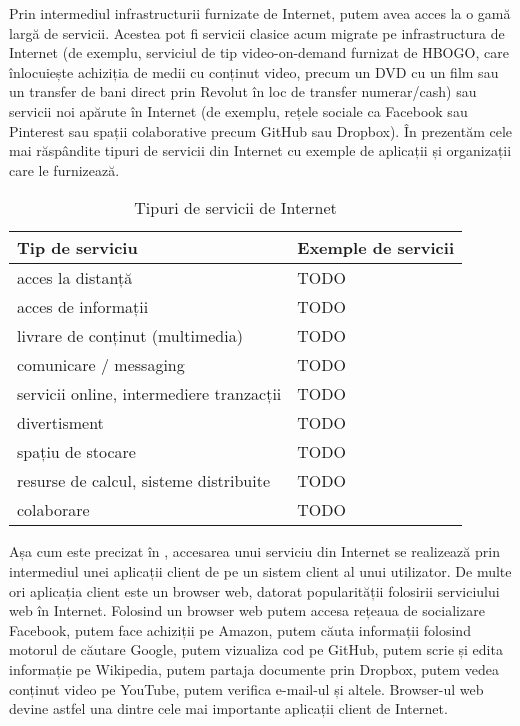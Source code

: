 Prin intermediul infrastructurii furnizate de Internet, putem avea acces la o gamă largă de servicii. Acestea pot fi servicii clasice acum migrate pe infrastructura de Internet (de exemplu, serviciul de tip video-on-demand furnizat de HBOGO, care înlocuiește  achiziția de medii cu conținut video, precum un DVD cu un film sau un transfer de bani direct prin Revolut în loc de transfer numerar/cash) sau servicii noi apărute în Internet (de exemplu, rețele sociale ca Facebook sau Pinterest sau spații colaborative precum GitHub sau Dropbox). În  prezentăm cele mai răspândite tipuri de servicii din Internet cu exemple de aplicații și organizații care le furnizează.

\begin{table}[!htb]
  \caption{Tipuri de servicii de Internet}
  \begin{center}
    \begin{tabular}{ p{} p{} }
      \toprule
        \textbf{Tip de serviciu} &
        \textbf{Exemple de servicii} \\
      \midrule
        acces la distanță &
        TODO \\

        acces de informații &
        TODO \\

        livrare de conținut (multimedia) &
        TODO \\

        comunicare / messaging &
        TODO \\

        servicii online, intermediere tranzacții &
        TODO \\

        divertisment &
        TODO \\

        spațiu de stocare &
        TODO \\

        resurse de calcul, sisteme distribuite &
        TODO \\

        colaborare &
        TODO \\
      \bottomrule
    \end{tabular}
    \label{tab:net:services}
  \end{center}
\end{table}

Așa cum este precizat în , accesarea unui serviciu din Internet se realizează prin intermediul unei aplicații client de pe un sistem client al unui utilizator. De multe ori aplicația client este un browser web, datorat popularității folosirii serviciului web în Internet. Folosind un browser web putem accesa rețeaua de socializare Facebook, putem face achiziții pe Amazon, putem căuta informații folosind motorul de căutare Google, putem vizualiza cod pe GitHub, putem scrie și edita informație pe Wikipedia, putem partaja documente prin Dropbox, putem vedea conținut video pe YouTube, putem verifica e-mail-ul și altele. Browser-ul web devine astfel una dintre cele mai importante aplicații client de Internet.

